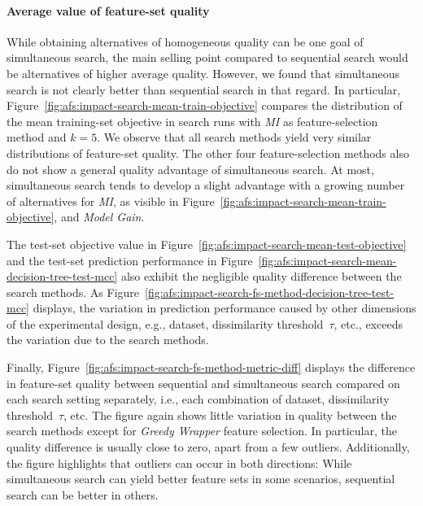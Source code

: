 \documentclass{article}
\theoremstyle{definition}
\begin{document}
\paragraph{Average value of feature-set quality}

While obtaining alternatives of homogeneous quality can be one goal of simultaneous search, the main selling point compared to sequential search would be alternatives of higher average quality.
However, we found that simultaneous search is not clearly better than sequential search in that regard.
In particular, Figure~\ref{fig:afs:impact-search-mean-train-objective} compares the distribution of the mean training-set objective in search runs with \emph{MI} as feature-selection method and $k=5$.
We observe that all search methods yield very similar distributions of feature-set quality.
The other four feature-selection methods also do not show a general quality advantage of simultaneous search.
At most, simultaneous search tends to develop a slight advantage with a growing number of alternatives for \emph{MI}, as visible in Figure~\ref{fig:afs:impact-search-mean-train-objective}, and \emph{Model Gain}.

The test-set objective value in Figure~\ref{fig:afs:impact-search-mean-test-objective} and the test-set prediction performance in Figure~\ref{fig:afs:impact-search-mean-decision-tree-test-mcc} also exhibit the negligible quality difference between the search methods.
As Figure~\ref{fig:afs:impact-search-fs-method-decision-tree-test-mcc} displays, the variation in prediction performance caused by other dimensions of the experimental design, e.g., dataset, dissimilarity threshold~$\tau$, etc., exceeds the variation due to the search methods.

Finally, Figure~\ref{fig:afs:impact-search-fs-method-metric-diff} displays the difference in feature-set quality between sequential and simultaneous search compared on each search setting separately, i.e., each combination of dataset, dissimilarity threshold~$\tau$, etc.
The figure again shows little variation in quality between the search methods except for \emph{Greedy Wrapper} feature selection.
In particular, the quality difference is usually close to zero, apart from a few outliers.
Additionally, the figure highlights that outliers can occur in both directions:
While simultaneous search can yield better feature sets in some scenarios, sequential search can be better in others.
\end{document}
